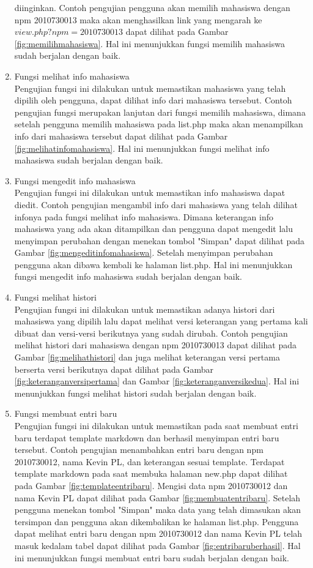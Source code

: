 \begin{enumerate}[(1)]
	diinginkan. Contoh pengujian pengguna akan memilih mahasiswa dengan npm
	2010730013 maka akan menghasilkan link yang mengarah ke
	$view.php?npm=2010730013$ dapat dilihat pada Gambar \ref{fig:memilihmahasiswa}.
	Hal ini menunjukkan fungsi memilih mahasiswa sudah berjalan dengan baik.
\item Fungsi melihat info mahasiswa\\
	Pengujian fungsi ini dilakukan untuk memastikan mahasiswa yang telah dipilih
	oleh pengguna, dapat dilihat info dari mahasiswa tersebut. Contoh pengujian
	fungsi merupakan lanjutan dari fungsi memilih mahasiswa, dimana setelah
	pengguna memilih mahasiswa pada list.php maka akan menampilkan info dari
	mahasiswa tersebut dapat dilihat pada Gambar \ref{fig:melihatinfomahasiswa}.
	Hal ini menunjukkan fungsi melihat info mahasiswa sudah berjalan dengan baik.
\item Fungsi mengedit info mahasiswa\\
	Pengujian fungsi ini dilakukan untuk memastikan info mahasiswa dapat diedit.
	Contoh pengujian mengambil info dari mahasiswa yang telah dilihat infonya pada
	fungsi melihat info mahasiswa. Dimana keterangan info mahasiswa yang ada akan
	ditampilkan dan pengguna dapat mengedit lalu menyimpan perubahan dengan menekan
	tombol "Simpan" dapat dilihat pada Gambar \ref{fig:mengeditinfomahasiswa}.
	Setelah menyimpan perubahan pengguna akan dibawa kembali ke halaman list.php.
	Hal ini menunjukkan fungsi mengedit info mahasiswa sudah berjalan dengan baik.
\item Fungsi melihat histori\\
	Pengujian fungsi ini dilakukan untuk memastikan adanya histori dari mahasiswa
	yang dipilih lalu dapat melihat versi keterangan yang pertama kali dibuat dan
	versi-versi berikutnya yang sudah dirubah. Contoh pengujian melihat histori
	dari mahasiswa dengan npm 2010730013 dapat dilihat pada Gambar
	\ref{fig:melihathistori} dan juga melihat keterangan versi pertama berserta
	versi berikutnya dapat dilihat pada Gambar \ref{fig:keteranganversipertama} dan
	Gambar \ref{fig:keteranganversikedua}. Hal ini menunjukkan fungsi melihat
	histori sudah berjalan dengan baik.
\item Fungsi membuat entri baru\\
	Pengujian fungsi ini dilakukan untuk memastikan pada saat membuat entri baru
	terdapat template markdown dan berhasil menyimpan entri baru tersebut. Contoh
	pengujian menambahkan entri baru dengan npm 2010730012, nama Kevin PL, dan
	keterangan sesuai template. Terdapat template markdown pada saat membuka
	halaman new.php dapat dilihat pada Gambar \ref{fig:templateentribaru}. Mengisi
	data npm 2010730012 dan nama Kevin PL dapat dilihat pada Gambar
	\ref{fig:membuatentribaru}. Setelah pengguna menekan tombol "Simpan" maka data
	yang telah dimasukan akan tersimpan dan pengguna akan dikembalikan ke halaman
	list.php. Pengguna dapat melihat entri baru dengan npm 2010730012 dan nama
	Kevin PL telah masuk kedalam tabel dapat dilihat pada Gambar
	\ref{fig:entribaruberhasil}. Hal ini menunjukkan fungsi membuat entri baru
	sudah berjalan dengan baik.
\end{enumerate}

